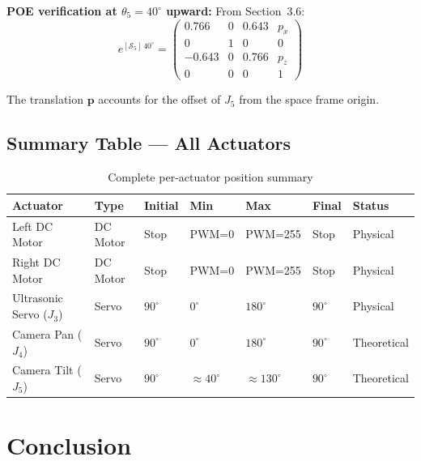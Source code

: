 \documentclass[12pt,a4paper]{article}
\newcommand{\vect}[1]{\bm{#1}}
\begin{document}
\textbf{POE verification at $\theta_5 = 40^\circ$ upward:}
From Section~3.6:
\[
  e^{[\mathcal{S}_5]\,40^\circ}
  = \begin{pmatrix}0.766&0&0.643&p_x\\0&1&0&0\\-0.643&0&0.766&p_z\\0&0&0&1\end{pmatrix}
\]

The translation $\vect{p}$ accounts for the offset of $J_5$ from the space frame origin.

\subsection{Summary Table --- All Actuators}

\begin{table}[h!]
\centering
\caption{Complete per-actuator position summary}
\renewcommand{\arraystretch}{1.4}
\begin{tabularx}{\linewidth}{L{3cm} C{1.5cm} C{1.8cm} C{1.8cm} C{1.8cm} C{1.8cm} C{2cm}}
\toprule
{}
\color{white}\textbf{Actuator} &
\color{white}\textbf{Type} &
\color{white}\textbf{Initial} &
\color{white}\textbf{Min} &
\color{white}\textbf{Max} &
\color{white}\textbf{Final} &
\color{white}\textbf{Status} \\
\midrule
Left DC Motor & DC Motor & Stop & PWM=0 & PWM=255 & Stop & \color{SuccessGreen}Physical \\
Right DC Motor & DC Motor & Stop & PWM=0 & PWM=255 & Stop & \color{SuccessGreen}Physical \\
Ultrasonic Servo ($J_3$) & Servo & $90^\circ$ & $0^\circ$ & $180^\circ$ & $90^\circ$ & \color{SuccessGreen}Physical \\
Camera Pan ($J_4$) & Servo & $90^\circ$ & $0^\circ$ & $180^\circ$ & $90^\circ$ & \color{DangerRed}Theoretical \\
Camera Tilt ($J_5$) & Servo & $90^\circ$ & ${\approx}40^\circ$ & ${\approx}130^\circ$ & $90^\circ$ & \color{DangerRed}Theoretical \\
\bottomrule
\end{tabularx}
\end{table}

\newpage
\section{Conclusion}
\end{document}
